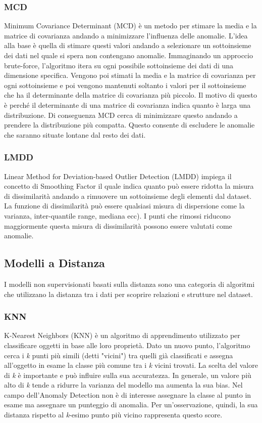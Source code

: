 \subsubsection{MCD}
Minimum Covariance Determinant (MCD) è un metodo per stimare la media e la matrice di covarianza andando a minimizzare l'influenza delle anomalie. L'idea alla base è quella di stimare questi valori andando a selezionare un sottoinsieme dei dati nel quale si spera non contengano anomalie.
Immaginando un approccio brute-force, l'algoritmo itera su ogni possibile sottoinsieme dei dati di una dimensione specifica. Vengono poi stimati la media e la matrice di covarianza per ogni sottoinsieme e poi vengono mantenuti soltanto i valori per il sottoinsieme che ha il determinante della matrice di covarianza più piccolo. Il motivo di questo è perché il determinante di una matrice di covarianza indica quanto è larga una distribuzione. Di conseguenza MCD cerca di minimizzare questo andando a prendere la distribuzione più compatta. Questo consente di escludere le anomalie che saranno situate lontane dal resto dei dati.

\subsubsection{LMDD}
Linear Method for Deviation-based Outlier Detection (LMDD) impiega il concetto di Smoothing Factor il quale indica quanto può essere ridotta la misura di dissimilarità andando a rimuovere un sottoinsieme degli elementi dal dataset. La funzione di dissimilarità può essere qualsiasi misura di dispersione come la varianza, inter-quantile range, mediana ecc).
I punti che rimossi riducono maggiormente questa misura di dissimilarità possono essere valutati come anomalie.

\subsection{Modelli a Distanza}
I modelli non supervisionati basati sulla distanza sono una categoria di algoritmi che utilizzano la distanza tra i dati per scoprire relazioni e strutture nel dataset.

\subsubsection{KNN}
K-Nearest Neighbors (KNN) è un algoritmo di apprendimento utilizzato per classificare oggetti in base alle loro proprietà. Dato un nuovo punto, l'algoritmo cerca i \textit{k} punti più simili (detti "vicini") tra quelli già classificati e assegna all'oggetto in esame la classe più comune tra i \textit{k} vicini trovati. La scelta del valore di \textit{k} è importante e può influire sulla sua accuratezza. In generale, un valore più alto di \textit{k} tende a ridurre la varianza del modello ma aumenta la sua bias.
Nel campo dell'Anomaly Detection non è di interesse assegnare la classe al punto in esame ma assegnare un punteggio di anomalia. Per un'osservazione, quindi, la sua distanza rispetto al \textit{k}-esimo punto più vicino rappresenta questo score.

